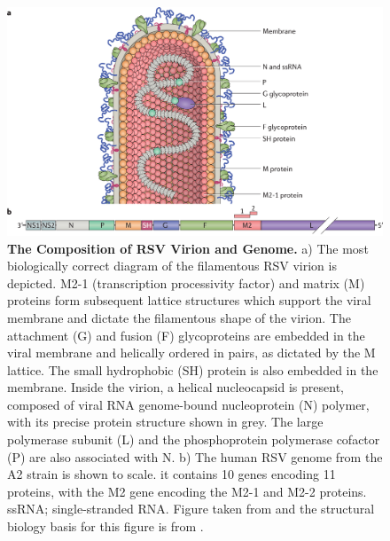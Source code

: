 \begin{figure}
    \centering
    \includegraphics[width=1\linewidth]{04. Introduction//Figs/07. RSV-composition.png}
    \caption[The Composition of RSV Virion and Genome.]{\textbf{The Composition of RSV Virion and Genome.} a) The most biologically correct diagram of the filamentous RSV virion is depicted. M2-1 (transcription processivity factor) and matrix (M) proteins form subsequent lattice structures which support the viral membrane and dictate the filamentous shape of the virion. The attachment (G) and fusion (F) glycoproteins are embedded in the viral membrane and helically ordered in pairs, as dictated by the M lattice. The small hydrophobic (SH) protein is also embedded in the membrane. Inside the virion, a helical nucleocapsid is present, composed of viral RNA genome-bound nucleoprotein (N) polymer, with its precise protein structure shown in grey. The large polymerase subunit (L) and the phosphoprotein polymerase cofactor (P) are also associated with N. b) The human RSV genome from the A2 strain is shown to scale. it contains 10 genes encoding 11 proteins, with the M2 gene encoding the M2-1 and M2-2 proteins. ssRNA; single-stranded RNA. Figure taken from \cite{Battles2019RespiratoryIt} and the structural biology basis for this figure is from \cite{Conley2022HelicalVirus}.}
    \label{fig:The Composition of RSV Virion and Genome}
\end{figure}


